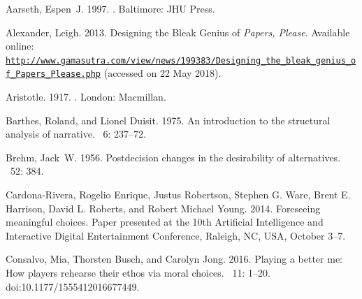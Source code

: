 \documentclass[arts,article,accept,moreauthors,pdftex,10pt,a4paper]{Definitions/mdpi}
\begin{document}
\begin{thebibliography}{999}

Aarseth, Espen~J. 1997.
.
\newblock Baltimore: JHU Press.

Alexander, Leigh. 2013.
\newblock Designing the Bleak Genius of {\emph{Papers, Please}}.
\newblock Available online:
  \href{http://www.gamasutra.com/view/news/199383/Designing_the_bleak_genius_of_Papers_Please.php}{\nolinkurl{http://www.gamasutra.com/view/news/199383/Designing_the_bleak_genius_of_Papers_Please.php}}
  (accessed on 22 May 2018).

Aristotle. 1917.
.
\newblock London: Macmillan.

Barthes, Roland, and Lionel Duisit. 1975.
\newblock An introduction to the structural analysis of narrative.
~{6\/}: 237--72.

Brehm, Jack~W. 1956.
\newblock Postdecision changes in the desirability of alternatives.
~{52\/}: 384.

Cardona-Rivera, Rogelio Enrique, Justus Robertson, Stephen G. Ware, Brent E. Harrison, David L. Roberts, and Robert Michael Young. 2014.
\newblock Foreseeing meaningful choices.
\newblock Paper presented at the 10th Artificial Intelligence and Interactive Digital
  Entertainment Conference, Raleigh, NC, USA, October 3--7.

Consalvo, Mia, Thorsten Busch, and Carolyn Jong. 2016.
\newblock Playing a better me: How players rehearse their ethos via moral
  choices.
~{11\/}: 1--20.
\newblock
 doi:10.1177/1555412016677449.


\end{thebibliography}
\end{document}
